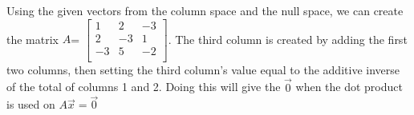	Using the given vectors from the column space and the null space, we can create the matrix $A$=
				$\begin{bmatrix}
				1 & 2 & -3 \\
				2 & -3 & 1 \\
				-3 & 5 & -2 \\ 
				\end{bmatrix}$.
				The third column is created by adding the first two columns, then setting the third column's value equal to the additive inverse of the total of columns 1 and 2.  Doing this will give the $\vec{0}$ when the dot product is used on $A\vec{x}=\vec{0}$
